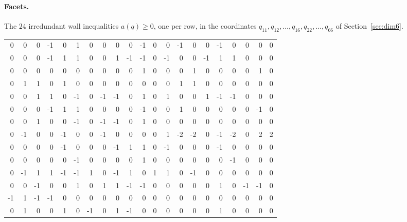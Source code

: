 \begingroup
\setlength{\tabcolsep}{2pt}
\renewcommand{\arraystretch}{0.95}
\paragraph{Facets.}
The \(24\) irredundant wall inequalities \(a(q)\geq 0\), one per row, in the
coordinates \(q_{11},q_{12},\ldots,q_{16},q_{22},\ldots,q_{66}\) of Section~\ref{sec:dim6}.

\begin{center}\scriptsize
\begin{tabular}{*{21}{r}}
0 & 0 & 0 & -1 & 0 & 1 & 0 & 0 & 0 & 0 & -1 & 0 & 0 & -1 & 0 & 0 & -1 & 0 & 0 & 0 & 0 \\
0 & 0 & 0 & -1 & 1 & 1 & 0 & 0 & 1 & -1 & -1 & 0 & -1 & 0 & 0 & -1 & 1 & 1 & 0 & 0 & 0 \\
0 & 0 & 0 & 0 & 0 & 0 & 0 & 0 & 0 & 0 & 1 & 0 & 0 & 0 & 1 & 0 & 0 & 0 & 0 & 1 & 0 \\
0 & 1 & 1 & 0 & 1 & 0 & 0 & 0 & 0 & 0 & 0 & 0 & 0 & 1 & 1 & 0 & 0 & 0 & 0 & 0 & 0 \\
0 & 0 & 1 & 1 & 0 & -1 & 0 & -1 & -1 & 0 & 1 & 0 & 1 & 0 & 0 & 1 & -1 & -1 & 0 & 0 & 0 \\
0 & 0 & 0 & -1 & 1 & 1 & 0 & 0 & 0 & 0 & -1 & 0 & 0 & 1 & 0 & 0 & 0 & 0 & 0 & -1 & 0 \\
0 & 0 & 1 & 0 & 0 & -1 & 0 & -1 & -1 & 0 & 1 & 0 & 0 & 0 & 0 & 0 & 0 & 0 & 0 & 0 & 0 \\
0 & -1 & 0 & 0 & -1 & 0 & 0 & -1 & 0 & 0 & 0 & 0 & 1 & -2 & -2 & 0 & -1 & -2 & 0 & 2 & 2 \\
0 & 0 & 0 & 0 & -1 & 0 & 0 & 0 & -1 & 1 & 1 & 0 & -1 & 0 & 0 & 0 & -1 & 0 & 0 & 0 & 0 \\
0 & 0 & 0 & 0 & 0 & -1 & 0 & 0 & 0 & 0 & 1 & 0 & 0 & 0 & 0 & 0 & 0 & -1 & 0 & 0 & 0 \\
0 & -1 & 1 & 1 & -1 & -1 & 1 & 0 & -1 & 1 & 0 & 1 & 1 & 0 & -1 & 0 & 0 & 0 & 0 & 0 & 0 \\
0 & 0 & -1 & 0 & 0 & 1 & 0 & 1 & 1 & -1 & -1 & 0 & 0 & 0 & 0 & 0 & 1 & 0 & -1 & -1 & 0 \\
-1 & 1 & -1 & -1 & 0 & 0 & 0 & 0 & 0 & 0 & 0 & 0 & 0 & 0 & 0 & 0 & 0 & 0 & 0 & 0 & 0 \\
0 & 1 & 0 & 0 & 1 & 0 & -1 & 0 & 1 & -1 & 0 & 0 & 0 & 0 & 0 & 0 & 1 & 0 & 0 & 0 & 0 \\

\end{tabular}
\end{center}
